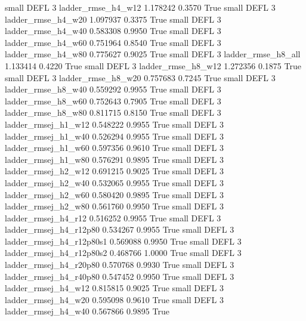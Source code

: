      small     DEFL                 3       ladder_rmse_h4_w12   1.178242      0.3570    True
     small     DEFL                 3       ladder_rmse_h4_w20   1.097937      0.3375    True
     small     DEFL                 3       ladder_rmse_h4_w40   0.583308      0.9950    True
     small     DEFL                 3       ladder_rmse_h4_w60   0.751964      0.8540    True
     small     DEFL                 3       ladder_rmse_h4_w80   0.775627      0.9025    True
     small     DEFL                 3       ladder_rmse_h8_all   1.133414      0.4220    True
     small     DEFL                 3       ladder_rmse_h8_w12   1.272356      0.1875    True
     small     DEFL                 3       ladder_rmse_h8_w20   0.757683      0.7245    True
     small     DEFL                 3       ladder_rmse_h8_w40   0.559292      0.9955    True
     small     DEFL                 3       ladder_rmse_h8_w60   0.752643      0.7905    True
     small     DEFL                 3       ladder_rmse_h8_w80   0.811715      0.8150    True
     small     DEFL                 3      ladder_rmsej_h1_w12   0.548222      0.9955    True
     small     DEFL                 3      ladder_rmsej_h1_w40   0.526294      0.9955    True
     small     DEFL                 3      ladder_rmsej_h1_w60   0.597356      0.9610    True
     small     DEFL                 3      ladder_rmsej_h1_w80   0.576291      0.9895    True
     small     DEFL                 3      ladder_rmsej_h2_w12   0.691215      0.9025    True
     small     DEFL                 3      ladder_rmsej_h2_w40   0.532065      0.9955    True
     small     DEFL                 3      ladder_rmsej_h2_w60   0.580420      0.9895    True
     small     DEFL                 3      ladder_rmsej_h2_w80   0.561760      0.9950    True
     small     DEFL                 3      ladder_rmsej_h4_r12   0.516252      0.9955    True
     small     DEFL                 3   ladder_rmsej_h4_r12p80   0.534267      0.9955    True
     small     DEFL                 3 ladder_rmsej_h4_r12p80s1   0.569088      0.9950    True
     small     DEFL                 3 ladder_rmsej_h4_r12p80s2   0.468766      1.0000    True
     small     DEFL                 3   ladder_rmsej_h4_r20p80   0.570768      0.9930    True
     small     DEFL                 3   ladder_rmsej_h4_r40p80   0.547452      0.9950    True
     small     DEFL                 3      ladder_rmsej_h4_w12   0.815815      0.9025    True
     small     DEFL                 3      ladder_rmsej_h4_w20   0.595098      0.9610    True
     small     DEFL                 3      ladder_rmsej_h4_w40   0.567866      0.9895    True

